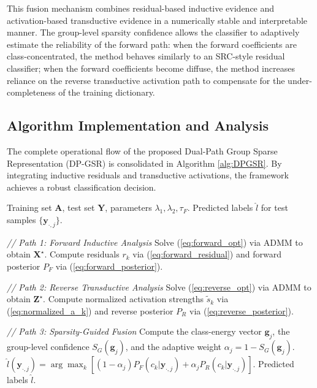 \documentclass[10pt,comsoc]{IEEEtran}
\begin{document}
This fusion mechanism combines residual-based inductive evidence and activation-based transductive evidence in a numerically stable and interpretable manner. The group-level sparsity confidence allows the classifier to adaptively estimate the reliability of the forward path: when the forward coefficients are class-concentrated, the method behaves similarly to an SRC-style residual classifier; when the forward coefficients become diffuse, the method increases reliance on the reverse transductive activation path to compensate for the under-completeness of the training dictionary.

\subsection{Algorithm Implementation and Analysis}
The complete operational flow of the proposed Dual-Path Group Sparse Representation (DP-GSR) is consolidated in Algorithm \ref{alg:DPGSR}. By integrating inductive residuals and transductive activations, the framework achieves a robust classification decision.

\begin{algorithm}[h]
\caption{Dual-Path Group Sparse Representation (DP-GSR)}
\label{alg:DPGSR}
\begin{algorithmic}[1]
\renewcommand{\algorithmicrequire}{\textbf{Input:}}
\renewcommand{\algorithmicensure}{\textbf{Output:}}
\REQUIRE Training set $\mathbf{A}$, test set $\mathbf{Y}$, parameters $\lambda_1, \lambda_2, \tau_F$.
\ENSURE Predicted labels $\hat{l}$ for test samples $\{\mathbf{y}_{\cdot,j}\}$.

\STATE \textit{// Path 1: Forward Inductive Analysis}
\STATE Solve (\ref{eq:forward_opt}) via ADMM to obtain $\mathbf{X}^\star$.
\STATE Compute residuals $r_k$ via (\ref{eq:forward_residual}) and forward posterior $P_F$ via (\ref{eq:forward_posterior}).

\STATE \textit{// Path 2: Reverse Transductive Analysis}
\STATE Solve (\ref{eq:reverse_opt}) via ADMM to obtain $\mathbf{Z}^\star$.
\STATE Compute normalized activation strengths $\tilde{s}_k$ via (\ref{eq:normalized_a_k}) and reverse posterior $P_R$ via (\ref{eq:reverse_posterior}).

\STATE \textit{// Path 3: Sparsity-Guided Fusion}
    \STATE Compute the class-energy vector $\mathbf{g}_j$, the group-level confidence $S_G(\mathbf{g}_j)$, and the adaptive weight $\alpha_j=1-S_G(\mathbf{g}_j)$.
    \STATE $\hat{l}(\mathbf{y}_{\cdot,j}) =
    \arg\max_k [(1-\alpha_j)P_F(c_k|\mathbf{y}_{\cdot,j})
    +\alpha_jP_R(c_k|\mathbf{y}_{\cdot,j})]$.
\ENDFOR
\STATE \RETURN Predicted labels $\hat{l}$.
\end{algorithmic}
\end{algorithm}
\end{document}
